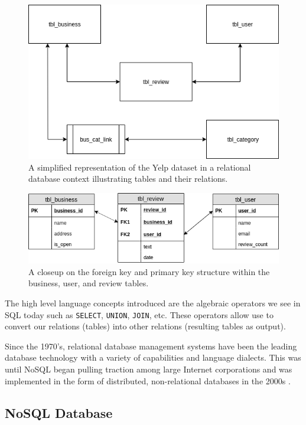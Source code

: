 \begin{figure}[h!]
    \centering
    \includegraphics[width=12cm]{img/relational-database.png}
    \caption{A simplified representation of the Yelp dataset in a relational database context illustrating tables and their relations.}
    \label{fig:relational-database}
\end{figure}

\begin{figure}[h!]
    \centering
    \includegraphics[width=13cm]{img/foreign-key.png}
    \caption{A closeup on the foreign key and primary key structure within the business, user, and review tables.}
    \label{fig:foreign-key}
\end{figure}

The high level language concepts introduced are the algebraic operators we see in SQL today such as \verb|SELECT|, \verb|UNION|, \verb|JOIN|, etc. These operators allow use to convert our relations (tables) into other relations (resulting tables as output).

Since the 1970's, relational database management systems have been the leading database technology with a variety of capabilities and language dialects. This was until NoSQL began pulling traction among large Internet corporations and was implemented in the form of distributed, non-relational databases in the 2000s \cite{data-in-nosql}.

\subsection{NoSQL Database}
\label{nosql-database}

